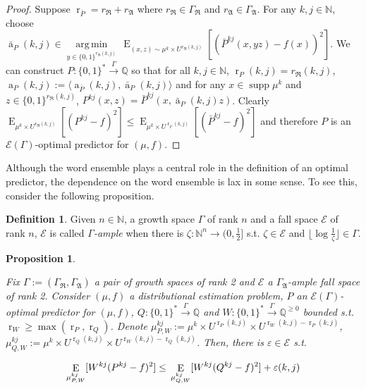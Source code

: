 \documentclass{article}
\theoremstyle{definition}
\newtheorem{definition}{Definition}[section]
\theoremstyle{plain}
\newtheorem{proposition}{Proposition}[section]
\newcommand{\Words}{{\{ 0, 1 \}^*}}
\newcommand{\WordsLen}[1]{{\{ 0, 1 \}^{#1}}}
\DeclareMathOperator{\Supp}{supp}
\DeclareMathOperator{\E}{E}
\DeclareMathOperator{\R}{r}
\DeclareMathOperator{\A}{a}
\newcommand{\Argmin}[1]{\underset{#1}{\operatorname{arg\,min}}\,}
\newcommand{\Nats}{\mathbb{N}}
\newcommand{\Rats}{\mathbb{Q}}
\newcommand{\Floor}[1]{\lfloor #1 \rfloor}
\newcommand{\Chev}[1]{\langle #1 \rangle}
\begin{document}
\begin{proof}

Suppose $\R_{\bar{P}}=r_{\mathfrak{R}}+r_{\mathfrak{A}}$ where $r_{\mathfrak{R}} \in \Gamma_{\mathfrak{R}}$ and $r_{\mathfrak{A}} \in \Gamma_{\mathfrak{A}}$. For any ${k,j \in \Nats}$, choose ${\bar{\A}_P(k,j) \in \Argmin{y \in \WordsLen{r_{\mathfrak{A}}(k,j)}} \E_{(x,z) \sim \mu^k \times U^{r_{\mathfrak{R}}(k,j)}}[(\bar{P}^{kj}(x,yz) - f(x))^2]}$. We can construct $P: \Words \xrightarrow{\Gamma} \Rats$ so that for all $k,j \in \Nats$, $\R_P(k,j) = r_{\mathfrak{R}}(k,j)$, $\A_P(k,j):=\Chev{\A_{\bar{P}}(k,j),\bar{\A}_P(k,j)}$ and for any $x \in \Supp \mu^k$ and $z \in \WordsLen{r_{\mathfrak{R}}(k,j)}$, ${P^{kj}(x,z)=\bar{P}^{kj}(x,\bar{\A}_P(k,j)z)}$. Clearly ${\E_{\mu^k \times U^{r_{\mathfrak{R}}(k,j)}}[(P^{kj} - f)^2] \leq \E_{\mu^k \times U^{\R_{\bar{P}}(k,j)}}[(\bar{P}^{kj} - f)^2]}$ and therefore $P$ is an $\mathcal{E}(\Gamma)$-optimal predictor for $(\mu,f)$.

\end{proof}

Although the word ensemble plays a central role in the definition of an optimal predictor, the dependence on the word ensemble is lax in some sense. To see this, consider the following proposition.

\begin{definition}

Given $n \in \Nats$, a growth space $\Gamma$ of rank $n$ and a fall space $\mathcal{E}$ of rank $n$, $\mathcal{E}$ is called \emph{$\Gamma$-ample} when there is $\zeta: \Nats^n \rightarrow (0,\frac{1}{2}]$ s.t.  $\zeta \in \mathcal{E}$ and $\Floor{\log \frac{1}{\zeta}} \in \Gamma$.

\end{definition}

\begin{proposition}
\label{prp:weight}

Fix $\Gamma:=(\Gamma_{\mathfrak{R}},\Gamma_{\mathfrak{A}})$ a pair of growth spaces of rank 2 and $\mathcal{E}$ a $\Gamma_{\mathfrak{A}}$-ample fall space of rank 2. Consider $(\mu,f)$ a distributional estimation problem, $P$ an $\mathcal{E}(\Gamma)$-optimal predictor for $(\mu,f)$, $Q: \Words \xrightarrow{\Gamma} \Rats$ and ${W: \Words \xrightarrow{\Gamma} \Rats^{\geq 0}}$ bounded s.t. $\R_W \geq \max(\R_P, \R_Q)$. Denote ${\mu^{kj}_{P,W}:=\mu^k \times U^{\R_P(k,j)} \times U^{\R_W(k,j)-\R_P(k,j)}}$, ${\mu^{kj}_{Q,W}:=\mu^k \times U^{\R_Q(k,j)} \times U^{\R_W(k,j)-\R_Q(k,j)}}$. Then, there is $\varepsilon \in \mathcal{E}$ s.t.

\begin{equation}
\E_{\mu^{kj}_{P,W}}[W^{kj}(P^{kj} - f)^2] \leq \\ \E_{\mu^{kj}_{Q,W}}[W^{kj}(Q^{kj} - f)^2] + \varepsilon(k,j)
\end{equation}

\end{proposition}
\end{document}
